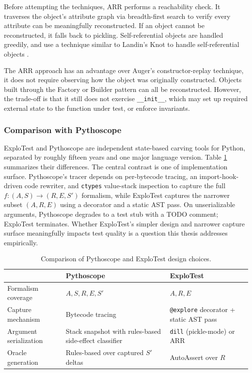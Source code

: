Before attempting the techniques, ARR performs a reachability check. It traverses the object's attribute graph via breadth-first search
to verify every attribute can be meaningfully reconstructed. If an object cannot be reconstructed, it falls back to pickling. Self-referential
objects are handled greedily, and use a technique similar to Landin's Knot to handle self-referential objects \cite{koronkevich2025one}.

The ARR approach has an advantage over Auger's constructor-replay technique, it does not require observing how the object was originally
constructed. Objects built through the Factory or Builder pattern can all be reconstructed. However, the trade-off is that it still does not
exercise \verb|__init__|, which may set up required external state to the function under test, or enforce invariants.

\subsubsection{Comparison with Pythoscope}
ExploTest and Pythoscope are independent state-based carving tools for Python, separated by roughly fifteen years and one major language version.
Table \ref{tab:pythoscope-explotest} summarizes their differences. The central contrast is one of implementation surface.
Pythoscope's tracer depends on per-bytecode tracing, an import-hook-driven code rewriter, and \verb|ctypes| value-stack inspection to capture the full
$f : (A, S) \rightarrow (R, E, S')$ formalism, while ExploTest captures the narrower subset $(A, R, E)$ using a decorator
and a static AST pass. On unserializable arguments,
Pythoscope degrades to a test stub with a TODO comment; ExploTest terminates.
Whether ExploTest's simpler design and narrower capture surface meaningfully impacts test quality is a question this thesis addresses empirically.

\begin{table}[h]
  \centering
  \caption{Comparison of Pythoscope and ExploTest design choices.}
  \label{tab:pythoscope-explotest}
  \begin{tabularx}{\linewidth}{l X X}
    \toprule
     & \textbf{Pythoscope}                                    & \textbf{ExploTest} \\
    \midrule
    Formalism coverage
     & $A, S, R, E, S'$
     & $A, R, E$                                                                   \\
    \addlinespace
    Capture mechanism
     & Bytecode tracing
     & \verb|@explore| decorator + static AST pass                                 \\
    \addlinespace
    Argument serialization
     & Stack snapshot with rules-based side-effect classifier
     & \verb|dill| (pickle-mode) or ARR                                            \\
    \addlinespace
    Oracle generation
     & Rules-based over captured $S'$ deltas
     & AutoAssert over $R$                                                         \\
    \bottomrule
  \end{tabularx}
\end{table}



